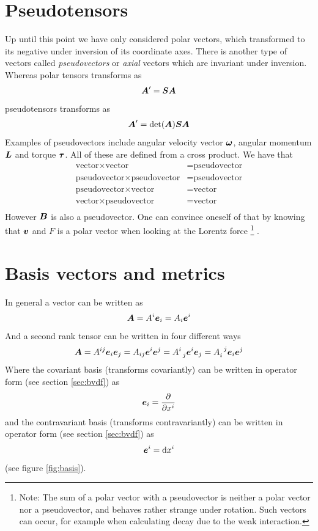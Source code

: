 \documentclass[a4paper, 12pt]{article}
\begin{document}
\section{Pseudotensors}
Up until this point we have only considered polar vectors, which transformed to
its negative under inversion of its coordinate axes. There is another type of
vectors called \emph{pseudovectors} or \emph{axial} vectors which are invariant
under inversion. Whereas polar tensors transforms as
%
\begin{align*}
 \boldsymbol{A}' = \boldsymbol{S}\boldsymbol{A}
\end{align*}
%
pseudotensors transforms as
%
\begin{align*}
 \boldsymbol{A}' = \det(\boldsymbol{A})\boldsymbol{S}\boldsymbol{A}
\end{align*}
%
Examples of pseudovectors include angular velocity vector $\boldsymbol{\omega}$,
angular momentum $\boldsymbol{L}$ and torque $\boldsymbol{\tau}$. All of these are defined
from a cross product. We have that
%
\begin{align*}
 \text{vector} \times \text{vector} &= \text{pseudovector}\\
 \text{pseudovector} \times \text{pseudovector} &= \text{pseudovector}\\
 \text{pseudovector} \times \text{vector} &= \text{vector}\\
 \text{vector} \times \text{pseudovector} &= \text{vector}\\
\end{align*}
%
However $\boldsymbol{B}$ is also a pseudovector. One can convince oneself of that by
knowing that $\boldsymbol{v}$ and $F$ is a polar vector when looking at the Lorentz
force%
\footnote{Note: The sum of a polar vector with a pseudovector is neither a
polar vector nor a pseudovector, and behaves rather strange under rotation.
Such vectors can occur, for example when calculating decay due to the weak
interaction.}%
.




\section{Basis vectors and metrics}
In general a vector can be written as
%
\begin{align*}
 \boldsymbol{A} = A^i\boldsymbol{e}_i = A_i\boldsymbol{e}^i
\end{align*}
%
And a second rank tensor can be written in four different ways
%
\begin{align*}
 \boldsymbol{A} =
 A^{ij}\boldsymbol{e}_i\boldsymbol{e}_j =
 A_{ij}\boldsymbol{e}^i\boldsymbol{e}^j =
 A^{i}_{\;\;j}\boldsymbol{e}^i\boldsymbol{e}_j =
 A_{i}^{\;\;j}\boldsymbol{e}_i\boldsymbol{e}^j
\end{align*}
%
Where the covariant basis (transforms covariantly) can be written in operator
form (see section \ref{sec:bvdf}) as
%
\begin{align}
 \boldsymbol{e}_i = \frac{\partial {}}{\partial{x^i}} \label{eq:cov_basis}
\end{align}
%
and the contravariant basis (transforms contravariantly) can be written in
operator form (see section \ref{sec:bvdf}) as
%
\begin{align}
 \boldsymbol{e}^i = \text{d}x^i \label{eq:con_basis}
\end{align}
%
(see figure \ref{fig:basis}).
\end{document}
